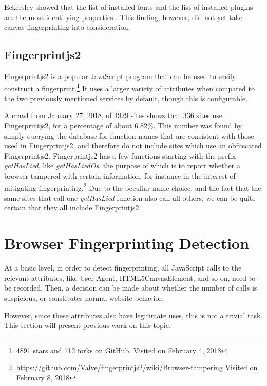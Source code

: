 \documentclass[
    fontsize=12pt,
    headings=small,
    parskip=half,
    bibliography=totoc,
    numbers=noenddot,
    open=any
    ]{scrreprt}
\begin{document}
Eckersley showed that the list of installed fonts and the list of installed plugins are the most identifying properties
\cite{eckersley2010unique}. This finding, however, did not yet take canvas fingerprinting into consideration.


\subsection{Fingerprintjs2}
\label{related_work:fingerprintjs2}
Fingerprintjs2 \cite{fingerprintjs2} is a popular JavaScript program that
can be used to easily construct a fingerprint.\footnote{4891 stars and 712 forks on GitHub. Visited on February 4, 2018}
It uses a larger variety of attributes when compared to the two previously mentioned services by default, though this is configurable.

A crawl from January 27, 2018, of 4929 sites shows that 336 sites use Fingerprintjs2, for a percentage of about 6.82\%.
This number was found by simply querying the database for function names that are consistent with
those used in Fingerprintjs2, and therefore do not include sites which use an obfuscated Fingerprintjs2.
Fingerprintjs2 has a few functions starting with the prefix \textit{getHasLied}, like \textit{getHasLiedOs}, the purpose
of which is to report whether a browser tampered with certain information, for instance in the interest of mitigating
fingerprinting.\footnote{\url{https://github.com/Valve/fingerprintjs2/wiki/Browser-tampering} Visited on February 8, 2018}
Due to the peculiar name choice, and the fact that the same sites that call one \textit{getHasLied}
function also call all others, we can be quite certain that they all include Fingerprintjs2.


\section{Browser Fingerprinting Detection}
At a basic level, in order to detect fingerprinting, all JavaScript calls to the relevant attributes,
like User Agent, HTML5CanvasElement, and so on, need to be recorded. Then, a decision can be made about whether the number
of calls is suspicious, or constitutes normal website behavior.

However, since these attributes also have legitimate uses, this is not a trivial task.
This section will present previous work on this topic.
\end{document}
